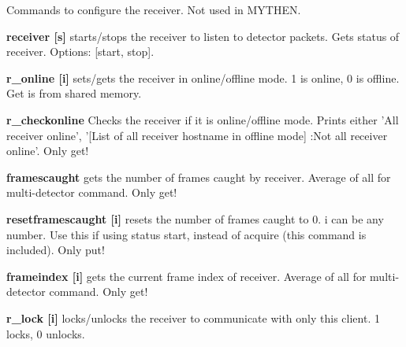Commands to configure the receiver. Not used in MYTHEN.


\begin{DoxyItemize}
\item {\bfseries receiver \mbox{[}s\mbox{]}} starts/stops the receiver to listen to detector packets. Gets status of receiver. Options: \mbox{[}start, stop\mbox{]}.
\end{DoxyItemize}


\begin{DoxyItemize}
\item {\bfseries r\_\-online \mbox{[}i\mbox{]}} sets/gets the receiver in online/offline mode. 1 is online, 0 is offline. Get is from shared memory.
\end{DoxyItemize}


\begin{DoxyItemize}
\item {\bfseries r\_\-checkonline} Checks the receiver if it is online/offline mode. Prints either 'All receiver online', '\mbox{[}List of all receiver hostname in offline mode\mbox{]} :Not all receiver online'. Only get!
\end{DoxyItemize}


\begin{DoxyItemize}
\item {\bfseries framescaught} gets the number of frames caught by receiver. Average of all for multi-\/detector command. Only get!
\end{DoxyItemize}


\begin{DoxyItemize}
\item {\bfseries resetframescaught \mbox{[}i\mbox{]}} resets the number of frames caught to 0. i can be any number. Use this if using status start, instead of acquire (this command is included). Only put!
\end{DoxyItemize}


\begin{DoxyItemize}
\item {\bfseries frameindex \mbox{[}i\mbox{]}} gets the current frame index of receiver. Average of all for multi-\/detector command. Only get!
\end{DoxyItemize}


\begin{DoxyItemize}
\item {\bfseries r\_\-lock \mbox{[}i\mbox{]}} locks/unlocks the receiver to communicate with only this client. 1 locks, 0 unlocks.
\end{DoxyItemize}



